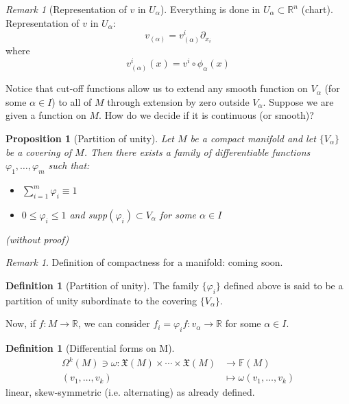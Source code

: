 \documentclass[a4paper,11pt,titlepage]{article}
\numberwithin{equation}{section}
\newtheorem{proposition}[theorem]{Proposition}
\theoremstyle{definition}
\newtheorem{definition}[theorem]{Definition}
\theoremstyle{remark}
\newtheorem{remark}[theorem]{Remark}
\newcommand{\rfield}{\mathbb{R}}
\begin{document}
\begin{remark}[Representation of $v$ in $U_{\alpha}$]
  Everything is done in $U_{\alpha} \subset \rfield^n$ (chart). Representation of $v$ in $U_{\alpha}$:
  $$v_{(\alpha)} = v_{(\alpha)}^i \partial_{x_i}$$
  where
  $$v_{(\alpha)}^i(x) = v^i \circ \phi_{\alpha}(x)$$
\end{remark}

Notice that cut-off functions allow us to extend any smooth function on $V_{\alpha}$ (for some $\alpha \in I$) to all of $M$ through extension by zero outside $V_{\alpha}$.
Suppose we are given a function on $M$. How do we decide if it is continuous (or smooth)?
\begin{proposition}[Partition of unity]
Let $M$ be a compact manifold and let $\{V_{\alpha}\}$ be a covering of $M$. Then there exists a family of differentiable functions $\varphi_1, \ldots, \varphi_m$ such that:
\begin{itemize}
  \item $\sum\limits_{i=1}^m \varphi_i \equiv 1$
  \item $0 \le \varphi_i \le 1$ and supp$(\varphi_i) \subset V_{\alpha}$ for some $\alpha \in I$
\end{itemize}
(without proof)
\end{proposition}

\begin{remark}
  Definition of compactness for a manifold: coming soon.
\end{remark}

\begin{definition}[Partition of unity]
  The family $\{\varphi_i\}$ defined above is said to be a partition of unity subordinate to the covering $\{V_{\alpha}\}$.
\end{definition}

Now, if $f \colon M \rightarrow \rfield$, we can consider $f_i = \varphi_i f \colon v_{\alpha} \rightarrow \rfield$ for some $\alpha \in I$.

\begin{definition}[Differential forms on M]
  \begin{align}
    \Omega^k(M) \ni \omega \colon \mathfrak{X}(M) \times \cdots \times \mathfrak{X}(M) &\rightarrow \mathbb{F}(M) \\
    (v_1, \ldots, v_k) &\mapsto \omega(v_1, \ldots, v_k) \nonumber
  \end{align}
  linear, skew-symmetric (i.e. alternating) as already defined.
\end{definition}
\end{document}
